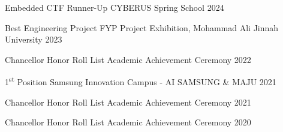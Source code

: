\begin{cvhonors} 


  \cvhonor
    {Embedded CTF Runner-Up} %
    {CYBERUS Spring School} %
    {\hspace{-2em}} %
    {2024} %
    
    
  \cvhonor
    {Best Engineering Project} %
    {FYP Project Exhibition, Mohammad Ali Jinnah University} %
    {\hspace{-2em}} %
    {2023} %

  \cvhonor
    {Chancellor Honor Roll List} %
    {Academic Achievement Ceremony} %
    {\hspace{-2em}} %
    {2022} %

  \cvhonor
    {1\textsuperscript{st} Position Samsung Innovation Campus - AI} %
    {SAMSUNG \& MAJU} %
    {\hspace{-2em} } %
    {2021} %

  \cvhonor
    {Chancellor Honor Roll List} %
    {Academic Achievement Ceremony} %
    {\hspace{-2em}} %
    {2021} %

  \cvhonor
    {Chancellor Honor Roll List} %
    {Academic Achievement Ceremony} %
    {\hspace{-2em}} %
    {2020} %


\end{cvhonors}



